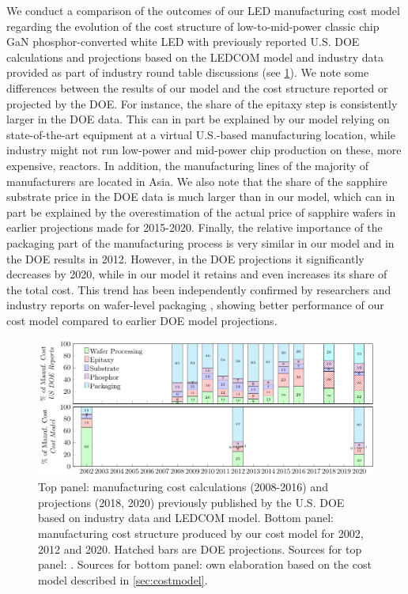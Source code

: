 \documentclass[parskip=full]{article}
\begin{document}
We conduct a comparison of the outcomes of our LED manufacturing cost model regarding the evolution of the cost structure of low-to-mid-power classic chip GaN phosphor-converted white LED with previously reported U.S. DOE calculations and projections based on the LEDCOM model and industry data provided as part of industry round table discussions (see \cref{fig:costmodel_calibration}). We note some differences between the results of our model and the cost structure reported or projected by the DOE. For instance, the share of the epitaxy step is consistently larger in the DOE data. This can in part be explained by our model relying on state-of-the-art equipment at a virtual U.S.-based manufacturing location, while industry might not run low-power and mid-power chip production on these, more expensive, reactors. In addition, the manufacturing lines of the majority of manufacturers are located in Asia. We also note that the share of the sapphire substrate price in the DOE data is much larger than in our model, which can in part be explained by the overestimation of the actual price of sapphire wafers in earlier projections made for 2015-2020. Finally, the relative importance of the packaging part of the manufacturing process is very similar in our model and in the DOE results in 2012. However, in the DOE projections it significantly decreases by 2020, while in our model it retains and even increases its share of the total cost. This trend has been independently confirmed by researchers and industry reports on wafer-level packaging \cite{Lee2011WPL,Xie2013,ledsmag2017WLP}, showing better performance of our cost model compared to earlier DOE model projections.

\begin{figure}[h]
	\centering
    \includegraphics[width=\textwidth]{./figures/costmodel_calibration.pdf}
	\caption{Top panel: manufacturing cost calculations (2008-2016) and projections (2018, 2020) previously published by the U.S. DOE based on industry data and LEDCOM model. Bottom panel: manufacturing cost structure produced by our cost model for 2002, 2012 and 2020. Hatched bars are DOE projections. Sources for top panel: \cite{doe2010solid}\cite{doe2011solid}\cite{doe2012solid}\cite{doe2013solid}\cite{doe2014solid}\cite{doe2015solid}\cite{doe2016solid}. Sources for bottom panel: own elaboration based on the cost model described in \cref{sec:costmodel}.}
	\label{fig:costmodel_calibration}
\end{figure}
\end{document}
